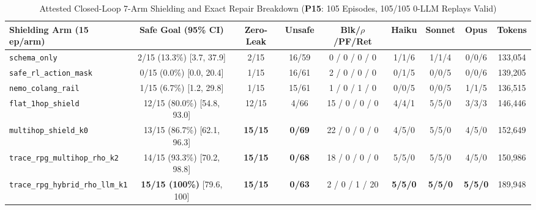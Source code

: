 \begin{table}[!tbp]
\caption{Attested Closed-Loop 7-Arm Shielding and Exact Repair Breakdown (\textbf{P15}: 105 Episodes, 105/105 0-LLM Replays Valid)}
\label{tab:kbs-mas}
\centering
\scriptsize
\setlength{\tabcolsep}{3.2pt}
\begin{tabularx}{\textwidth}{@{}>{\raggedright\arraybackslash}Xcccccccc@{}}
\toprule
\textbf{Shielding Arm (15 ep/arm)} & \textbf{Safe Goal (95\% CI)} & \textbf{Zero-Leak} & \textbf{Unsafe} & \textbf{Blk/$\rho$/PF/Ret} & \textbf{Haiku} & \textbf{Sonnet} & \textbf{Opus} & \textbf{Tokens} \\
\midrule
\texttt{schema\_only} & 2/15 (13.3\%) [3.7, 37.9] & 2/15 & 16/59 & 0 / 0 / 0 / 0 & 1/1/6 & 1/1/4 & 0/0/6 & 133,054 \\
\texttt{safe\_rl\_action\_mask}~\cite{alshiekh2018shield} & 0/15 (0.0\%) [0.0, 20.4] & 1/15 & 16/61 & 2 / 0 / 0 / 0 & 0/1/5 & 0/0/5 & 0/0/6 & 139,205 \\
\texttt{nemo\_colang\_rail}~\cite{rebedea2023nemo} & 1/15 (6.7\%) [1.2, 29.8] & 1/15 & 15/61 & 1 / 0 / 1 / 0 & 0/0/5 & 0/0/5 & 1/1/5 & 136,515 \\
\texttt{flat\_1hop\_shield} & 12/15 (80.0\%) [54.8, 93.0] & 12/15 & 4/66 & 15 / 0 / 0 / 0 & 4/4/1 & 5/5/0 & 3/3/3 & 146,446 \\
\texttt{multihop\_shield\_k0} & 13/15 (86.7\%) [62.1, 96.3] & \textbf{15/15} & \textbf{0/69} & 22 / 0 / 0 / 0 & 4/5/0 & 5/5/0 & 4/5/0 & 152,649 \\
\texttt{trace\_rpg\_multihop\_rho\_k2} & 14/15 (93.3\%) [70.2, 98.8] & \textbf{15/15} & \textbf{0/68} & 18 / 0 / 0 / 0 & 5/5/0 & 5/5/0 & 4/5/0 & 150,986 \\
\texttt{trace\_rpg\_hybrid\_rho\_llm\_k1} & \textbf{15/15 (100\%)} [79.6, 100] & \textbf{15/15} & \textbf{0/63} & 2 / 0 / 1 / 20 & \textbf{5/5/0} & \textbf{5/5/0} & \textbf{5/5/0} & 189,948 \\
\bottomrule
\end{tabularx}
\end{table}

